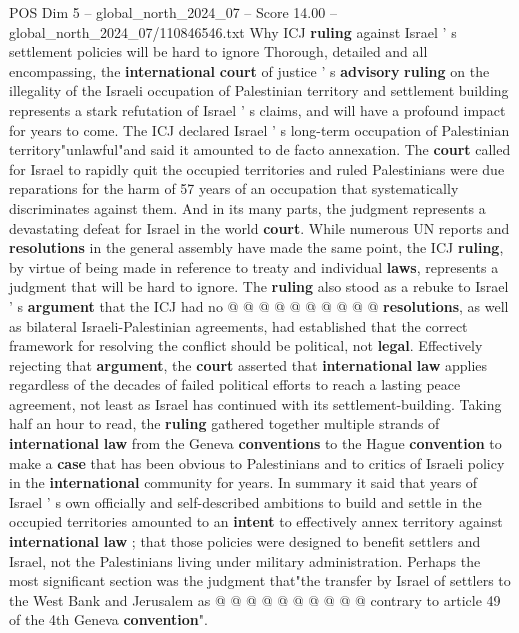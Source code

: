 \begin{textsample}{POS Dim 5 – global\_north\_2024\_07 – Score 14.00 – global\_north\_2024\_07/110846546.txt}  \label{ex:f5_pos_304}
Why ICJ \textbf{ruling} against Israel ' s settlement policies will be hard to ignore Thorough, detailed and all encompassing, the \textbf{international} \textbf{court} of justice ' s \textbf{advisory} \textbf{ruling} on the illegality of the Israeli occupation of Palestinian territory and settlement building represents a stark refutation of Israel ' s claims, and will have a profound impact for years to come.
The ICJ declared Israel ' s long-term occupation of Palestinian territory"unlawful"and said it amounted to de facto annexation.
The \textbf{court} called for Israel to rapidly quit the occupied territories and ruled Palestinians were due reparations for the harm of 57 years of an occupation that systematically discriminates against them.
And in its many parts, the judgment represents a devastating defeat for Israel in the world \textbf{court}.
While numerous UN reports and \textbf{resolutions} in the general assembly have made the same point, the ICJ \textbf{ruling}, by virtue of being made in reference to treaty and individual \textbf{laws}, represents a judgment that will be hard to ignore.
The \textbf{ruling} also stood as a rebuke to Israel ' s \textbf{argument} that the ICJ had no @ @ @ @ @ @ @ @ @ @ \textbf{resolutions}, as well as bilateral Israeli-Palestinian agreements, had established that the correct framework for resolving the conflict should be political, not \textbf{legal}.
Effectively rejecting that \textbf{argument}, the \textbf{court} asserted that \textbf{international} \textbf{law} applies regardless of the decades of failed political efforts to reach a lasting peace agreement, not least as Israel has continued with its settlement-building.
Taking half an hour to read, the \textbf{ruling} gathered together multiple strands of \textbf{international} \textbf{law} from the Geneva \textbf{conventions} to the Hague \textbf{convention} to make a \textbf{case} that has been obvious to Palestinians and to critics of Israeli policy in the \textbf{international} community for years.
In summary it said that years of Israel ' s own officially and self-described ambitions to build and settle in the occupied territories amounted to an \textbf{intent} to effectively annex territory against \textbf{international} \textbf{law} ; that those policies were designed to benefit settlers and Israel, not the Palestinians living under military administration.
Perhaps the most significant section was the judgment that"the transfer by Israel of settlers to the West Bank and Jerusalem as @ @ @ @ @ @ @ @ @ @ contrary to article 49 of the 4th Geneva \textbf{convention}".

\end{textsample}
